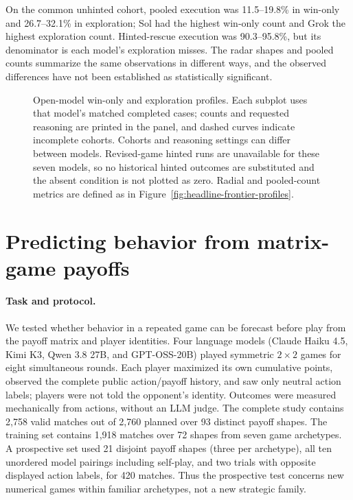 On the common unhinted cohort, pooled execution was 11.5--19.8\% in win-only and
26.7--32.1\% in exploration; Sol had the highest win-only count and Grok the
highest exploration count.  Hinted-rescue execution was 90.3--95.8\%, but its
denominator is each model's exploration misses.  The radar shapes and pooled
counts summarize the same observations in different ways, and the observed
differences have not been established as statistically significant.

\begin{figure}[tb]
  \centering
  
  \caption{Open-model win-only and exploration profiles.  Each subplot uses
  that model's matched completed cases; counts and requested reasoning are
  printed in the panel, and dashed curves indicate incomplete cohorts.
  Cohorts and reasoning settings can differ between models.  Revised-game
  hinted runs are unavailable for these seven models, so no historical hinted
  outcomes are substituted and the absent condition is not plotted as zero.
  Radial and pooled-count metrics are defined as in
  Figure~\ref{fig:headline-frontier-profiles}.}
  \label{fig:headline-open-profiles}
\end{figure}

\section{Predicting behavior from matrix-game payoffs}
\label{sec:payoff-behavior-prediction}

\paragraph{Task and protocol.}
We tested whether behavior in a repeated game can be forecast before play from the payoff matrix and player identities. Four language models (Claude Haiku 4.5, Kimi K3, Qwen 3.8 27B, and GPT-OSS-20B) played symmetric \(2\times2\) games for eight simultaneous rounds. Each player maximized its own cumulative points, observed the complete public action/payoff history, and saw only neutral action labels; players were not told the opponent's identity. Outcomes were measured mechanically from actions, without an LLM judge. The complete study contains 2,758 valid matches out of 2,760 planned over 93 distinct payoff shapes. The training set contains 1,918 matches over 72 shapes from seven game archetypes. A prospective set used 21 disjoint payoff shapes (three per archetype), all ten unordered model pairings including self-play, and two trials with opposite displayed action labels, for 420 matches. Thus the prospective test concerns new numerical games within familiar archetypes, not a new strategic family.

